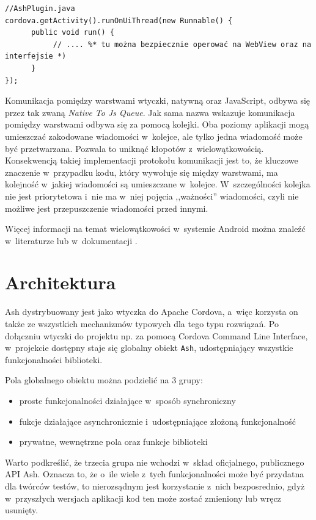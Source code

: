 \documentclass[brudnopis]{xmgr}
\begin{document}
\begin{lstlisting}
//AshPlugin.java
cordova.getActivity().runOnUiThread(new Runnable() {
      public void run() {
           // .... %* tu można bezpiecznie operować na WebView oraz na interfejsie *)
      }
});
\end{lstlisting}

Komunikacja pomiędzy warstwami wtyczki, natywną oraz JavaScript, odbywa się przez tak zwaną \textit{Native To Js Queue}. Jak sama nazwa wskazuje komunikacja pomiędzy warstwami odbywa się za pomocą kolejki. Oba poziomy aplikacji mogą umieszczać zakodowane wiadomości w~kolejce, ale tylko jedna wiadomość może być przetwarzana. Pozwala to uniknąć kłopotów z~wielowątkowością. Konsekwencją takiej implementacji protokołu komunikacji jest to, że kluczowe znaczenie w~przypadku kodu, który wywołuje się między warstwami,  ma kolejność w~jakiej wiadomości są umieszczane w~kolejce. W~szczególności kolejka nie jest priorytetowa i~nie ma w~niej pojęcia ,,ważności'' wiadomości, czyli nie możliwe jest przepuszczenie wiadomości przed innymi.

Więcej informacji na temat wielowątkowości w~systemie Android można znaleźć w~literaturze \cite{AndroidInPractice} lub w~dokumentacji \cite{AndroidDoc}. 

\chapter{Architektura}

Ash dystrybuowany jest jako wtyczka do Apache Cordova, a~więc korzysta on także ze wszystkich mechanizmów typowych dla tego typu rozwiązań. Po dołączniu wtyczki do projektu np. za pomocą Cordova Command Line Interface, w~projekcie dostępny staje się globalny obiekt \texttt{Ash}, udostępniający wszystkie funkcjonalności biblioteki. 

Pola globalnego obiektu można podzielić na 3 grupy:  
\begin{itemize}
  \item proste funkcjonalności działające w~sposób synchroniczny
  \item fukcje działające asynchronicznie i~udostępniające złożoną funkcjonalność 
  \item prywatne, wewnętrzne pola oraz funkcje biblioteki
\end{itemize}
Warto podkreślić, że trzecia grupa nie wchodzi w~skład oficjalnego, publicznego API Ash. Oznacza to, że o~ile wiele z~tych funkcjonalności może być przydatna dla twórców testów, to nierozsądnym jest korzystanie z~nich bezposrednio, gdyż w~przyszłych wersjach aplikacji kod ten może zostać zmieniony lub wręcz usunięty.
\end{document}
